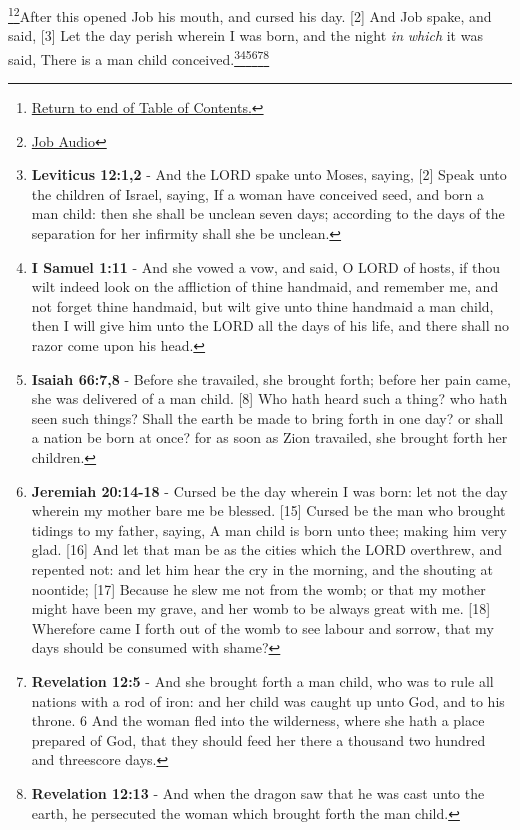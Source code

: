 \footnote{\textcolor[cmyk]{0.99998,1,0,0}{\hyperlink{TOC}{Return to end of Table of Contents.}}}\footnote{\href{https://www.audioverse.org/english/audiobibles/books/ENGKJV/O/Job/1}{\textcolor[cmyk]{0.99998,1,0,0}{Job  Audio}}}\textcolor[cmyk]{0.99998,1,0,0}{After this opened Job his mouth, and cursed his day.}
[2] \textcolor[cmyk]{0.99998,1,0,0}{And Job spake, and said,}
[3] \textcolor[cmyk]{0.99998,1,0,0}{Let the day perish wherein I was born, and the night \emph{in} \emph{which} it was said, There is a man child conceived.}\footnote{\textbf{Leviticus 12:1,2} - And the LORD spake unto Moses, saying, [2] Speak unto the children of Israel, saying, If a woman have conceived seed, and born a man child: then she shall be unclean seven days; according to the days of the separation for her infirmity shall she be unclean.}\footnote{\textbf{I Samuel 1:11} - And she vowed a vow, and said, O LORD of hosts, if thou wilt indeed look on the affliction of thine handmaid, and remember me, and not forget thine handmaid, but wilt give unto thine handmaid a man child, then I will give him unto the LORD all the days of his life, and there shall no razor come upon his head.}\footnote{\textbf{Isaiah 66:7,8} - Before she travailed, she brought forth; before her pain came, she was delivered of a man child. [8] Who hath heard such a thing? who hath seen such things? Shall the earth be made to bring forth in one day? or shall a nation be born at once? for as soon as Zion travailed, she brought forth her children.}\footnote{\textbf{Jeremiah 20:14-18} - Cursed be the day wherein I was born: let not the day wherein my mother bare me be blessed. [15] Cursed be the man who brought tidings to my father, saying, A man child is born unto thee; making him very glad. [16] And let that man be as the cities which the LORD overthrew, and repented not: and let him hear the cry in the morning, and the shouting at noontide; [17] Because he slew me not from the womb; or that my mother might have been my grave, and her womb to be always great with me. [18] Wherefore came I forth out of the womb to see labour and sorrow, that my days should be consumed with shame?}\footnote{\textbf{Revelation 12:5} - And she brought forth a man child, who was to rule all nations with a rod of iron: and her child was caught up unto God, and to his throne. 6 And the woman fled into the wilderness, where she hath a place prepared of God, that they should feed her there a thousand two hundred and threescore days.}\footnote{\textbf{Revelation 12:13} - And when the dragon saw that he was cast unto the earth, he persecuted the woman which brought forth the man child.}
